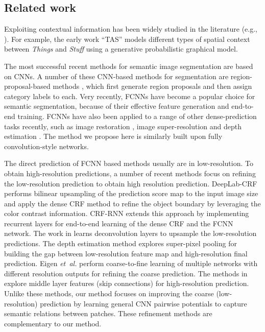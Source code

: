 \subsection{Related work}

Exploiting contextual information
has been widely studied in the literature (e.g., \cite{rabinovich2007objects,heitz2008learning,doersch2014context}).  
For example, the early work ``TAS'' \cite{heitz2008learning} models different types of spatial context between {\em Things} and {\em Stuff}
using a generative probabilistic graphical model.


The most successful recent methods for semantic image segmentation are based on CNNs.
A number of these CNN-based methods for segmentation are region-proposal-based methods \cite{GirshickDDM13,BharathECCV2014}, which first generate region proposals and then assign category labels to each.  Very recently,  FCNNs
 \cite{LongSD14,ChenPKMY14,Dai2015arXiv} have become a popular choice for semantic segmentation, because of their effective feature generation and end-to-end training.
FCNNs
have also been applied to a range of other dense-prediction tasks recently,
 such as image restoration \cite{Eigen_iccv13}, image super-resolution \cite{Dong_eccv14}
 and depth estimation \cite{dcnn_nips14,liu2014deep}.
The method we propose here is similarly
built upon fully convolution-style networks.


The direct prediction of FCNN based methods usually are in low-resolution.
To obtain high-resolution predictions, a number of recent methods focus on refining the low-resolution prediction to obtain high resolution prediction.
DeepLab-CRF \cite{ChenPKMY14} performs bilinear upsampling of the prediction score map to the input image size and apply the dense CRF method \cite{krahenbuhl2012efficient} to refine the object boundary by leveraging the color contrast information.
CRF-RNN \cite{zheng2015conditional} extends this approach by implementing recurrent layers for end-to-end learning of the dense CRF and the FCNN network.
The work in \cite{noh2015learning} learns deconvolution layers to upsample the low-resolution predictions.
The depth estimation method \cite{liu2015learning} explores super-pixel pooling 
for building the gap between low-resolution feature map and high-resolution final prediction.
Eigen \textit{et~al.} \cite{eigen2015predicting} perform coarse-to-fine learning of multiple networks with different resolution outputs for refining the coarse prediction.
The methods in \cite{hariharan2014hypercolumns,LongSD14} explore middle layer features (skip connections) for high-resolution prediction.
Unlike these methods, our method focuses on improving the coarse (low-resolution) prediction 
by learning general CNN pairwise potentials to capture semantic relations between patches.
These refinement methods are complementary to our method.



